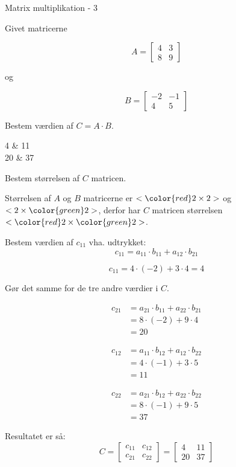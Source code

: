 \documentclass{article}
\begin{document}
\newpage

\begin{exercise}{Matrix multiplikation - 3}
	
	Givet matricerne 
	
	\[
	A = \left[\begin{array}{rr}
	4 & 3 \\ 
	8 & 9 
	\end{array} \right]
	\]
	
	og 
	
	\[
	B = \left[\begin{array}{rr}
	-2 & -1 \\ 
	4 & 5 
	\end{array} \right]
	\]
	
	Bestem værdien af $C = A \cdot B$.
	
	\begin{answermatrix}
		4 & 11  \\
		20 & 37 
	\end{answermatrix}
	
	\hint
	Bestem størrelsen af $C$ matricen.
	
	\hint
	Størrelsen af $A$ og $B$ matricerne er $<{\color{red} 2} \times 2>$ og $<2 \times {\color{green}2}>$, 
	derfor har $C$ matricen størrelsen $<{\color{red} 2} \times {\color{green}2}>$.
	
	\hint
	Bestem værdien af $c_{11}$ vha. udtrykket:
	\[
	c_{11} = a_{11} \cdot b_{11} + a_{12} \cdot b_{21}
	\]
	
	\hint
	\[
	c_{11} = 4 \cdot (-2) + 3 \cdot 4 = 4
	\]
	
	\hint
	Gør det samme for de tre andre værdier i $C$.
	
	\hint
	\begin{align*}
		c_{21} & = a_{21} \cdot b_{11} + a_{22} \cdot b_{21} \\
		& = 8 \cdot (-2) + 9 \cdot 4 \\
		& = 20
	\end{align*}
	
	\hint
	\begin{align*}
		c_{12} & = a_{11} \cdot b_{12} + a_{12} \cdot b_{22} \\
		& = 4 \cdot (-1) + 3 \cdot 5 \\
		& = 11
	\end{align*}
	
	\hint
	\begin{align*}
		c_{22} & = a_{21} \cdot b_{12} + a_{22} \cdot b_{22} \\
		& = 8 \cdot (-1) + 9 \cdot 5 \\
		& = 37
	\end{align*}
	
	
	\hint
	Resultatet er så:
	\[
	C = \left[\begin{array}{rr}
	c_{11} & c_{12} \\
	c_{21} & c_{22} 
	\end{array} \right] = 
	\left[\begin{array}{rr}
	4 & 11 \\
	20 & 37 
	\end{array} \right]
	\]
	
	
\end{exercise}
\end{document}
